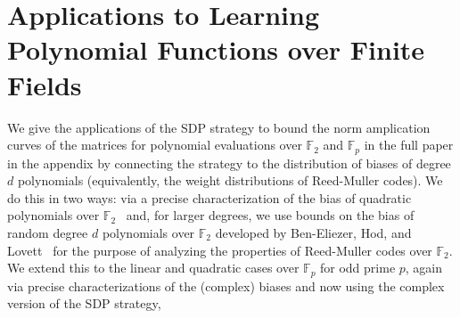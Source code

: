 \newcommand{\w}{\textrm{weight}}
\section{Applications to Learning Polynomial Functions over Finite Fields}

We give the applications of the SDP strategy to bound the norm amplication
curves of the matrices for polynomial evaluations over
$\mathbb{F}_2$ and $\mathbb{F}_p$
in the full paper in the appendix by connecting the strategy to the
distribution of biases of degree $d$ polynomials
(equivalently, the weight distributions of Reed-Muller codes). 
We do this in two ways: via a precise characterization of the bias of
quadratic polynomials over $\mathbb{F}_2$~\cite{DBLP:journals/tit/SloaneB70} 
and, for larger degrees, we use bounds on the bias of random degree $d$
polynomials over $\mathbb{F}_2$ developed by Ben-Eliezer,
Hod, and Lovett~\cite{DBLP:journals/cc/Ben-EliezerHL12} for the purpose of 
analyzing the properties of Reed-Muller codes over $\mathbb{F}_2$.
We extend this to the linear and quadratic cases over $\mathbb{F}_p$ for odd
prime $p$, again via precise characterizations of the (complex) biases and
now using the complex version of the SDP strategy,



